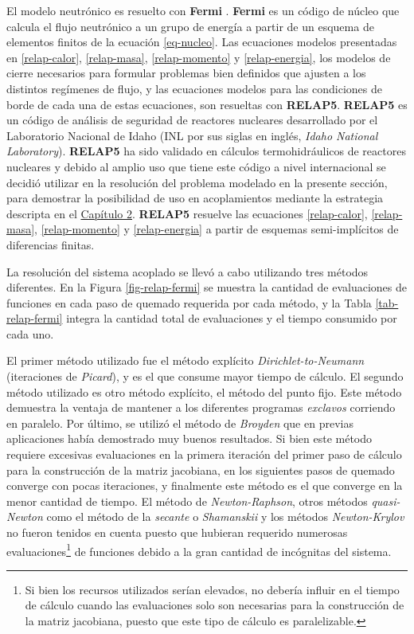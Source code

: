 El modelo neutrónico es resuelto con \textbf{Fermi} \cite{fermi}.
\textbf{Fermi} es un código de núcleo que calcula el flujo neutrónico a un grupo de energía a partir de un esquema de elementos finitos de la ecuación \ref{eq-nucleo}.
Las ecuaciones modelos presentadas en \ref{relap-calor}, \ref{relap-masa}, \ref{relap-momento} y \ref{relap-energia},
los modelos de cierre necesarios para formular problemas bien definidos que ajusten a los distintos regímenes de flujo,
y las ecuaciones modelos para las condiciones de borde de cada una de estas ecuaciones,
son resueltas con \textbf{RELAP5}.
\textbf{RELAP5} es un código de análisis de seguridad de reactores nucleares desarrollado por el Laboratorio Nacional de Idaho (INL por sus siglas en inglés, \textit{Idaho National Laboratory}).
\textbf{RELAP5} ha sido validado en cálculos termohidráulicos de reactores nucleares y debido al amplio uso que tiene este código a nivel internacional
se decidió utilizar en la resolución del problema modelado en la presente sección,
para demostrar la posibilidad de uso en acoplamientos mediante la estrategia descripta en el \hyperlink{chapter.2}{Capítulo 2}.
\textbf{RELAP5} resuelve las ecuaciones \ref{relap-calor}, \ref{relap-masa}, \ref{relap-momento} y \ref{relap-energia} a partir de esquemas semi-implícitos de diferencias finitas.

La resolución del sistema acoplado se llevó a cabo utilizando tres métodos diferentes.
En la Figura \ref{fig-relap-fermi} se muestra la cantidad de evaluaciones de funciones en cada paso de quemado requerida por cada método,
y la Tabla \ref{tab-relap-fermi} integra la cantidad total de evaluaciones y el tiempo consumido por cada uno.

El primer método utilizado fue el método explícito \textit{Dirichlet-to-Neumann} (iteraciones de \textit{Picard}), y es el que consume mayor tiempo de cálculo.
El segundo método utilizado es otro método explícito, el método del punto fijo.
Este método demuestra la ventaja de mantener a los diferentes programas \textit{exclavos} corriendo en paralelo.
Por último, se utilizó el método de \textit{Broyden} que en previas aplicaciones había demostrado muy buenos resultados.
Si bien este método requiere excesivas evaluaciones en la primera iteración del primer paso de cálculo para la construcción de la matriz jacobiana,
en los siguientes pasos de quemado converge con pocas iteraciones, y finalmente
este método es el que converge en la menor cantidad de tiempo.
El método de \textit{Newton-Raphson}, otros métodos \textit{quasi-Newton} como el método de la \textit{secante} o \textit{Shamanskii} y los métodos \textit{Newton-Krylov}
no fueron tenidos en cuenta puesto que hubieran requerido numerosas evaluaciones\footnote{
Si bien los recursos utilizados serían elevados,
no debería influir en el tiempo de cálculo cuando las evaluaciones solo son necesarias para la construcción de la matriz jacobiana,
puesto que este tipo de cálculo es paralelizable.
} de funciones debido a la gran cantidad de incógnitas del sistema.

